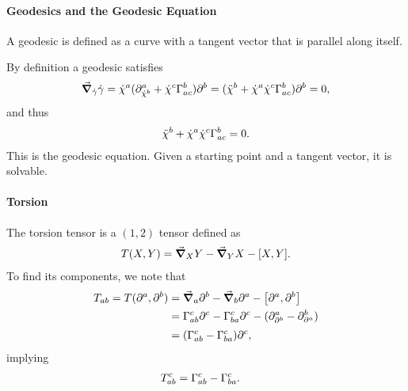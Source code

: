 \paragraph{Geodesics and the Geodesic Equation}
A geodesic is defined as a curve with a tangent vector that is parallel along itself.

By definition a geodesic satisfies
\begin{align*}
	\dcov{\dot{\gamma}}{\dot{\gamma}} = \dot{\chi}^{a}(\del{a}{\dot{\chi}^{b}} + \dot{\chi}^{c}\chris{b}{a}{c})\del{b}{} = (\ddot{\chi}^{b} + \dot{\chi}^{a}\dot{\chi}^{c}\chris{b}{a}{c})\del{b}{} = 0,
\end{align*}
and thus
\begin{align*}
	\ddot{\chi}^{b} + \dot{\chi}^{a}\dot{\chi}^{c}\chris{b}{a}{c} = 0.
\end{align*}
This is the geodesic equation. Given a starting point and a tangent vector, it is solvable.

\paragraph{Torsion}
The torsion tensor is a $(1, 2)$ tensor defined as
\begin{align*}
	T(X, Y) = \dcov{X}{Y} - \dcov{Y}{X} - \comm{X}{Y}.
\end{align*}
To find its components, we note that
\begin{align*}
	T_{ab} = T(\del{a}{}, \del{b}{}) &= \dcov{a}{\del{b}{}} - \dcov{b}{\del{a}{}} - \comm{\del{a}{}}{\del{b}{}} \\
	                                 &= \chris{c}{a}{b}\del{c}{} - \chris{c}{b}{a}\del{c}{} - (\del{a}{\del{b}{}} - \del{b}{\del{a}{}}) \\
	                                 &= (\chris{c}{a}{b} - \chris{c}{b}{a})\del{c}{},
\end{align*}
implying
\begin{align*}
	T_{ab}^{c} &= \chris{c}{a}{b} - \chris{c}{b}{a}.
\end{align*}

